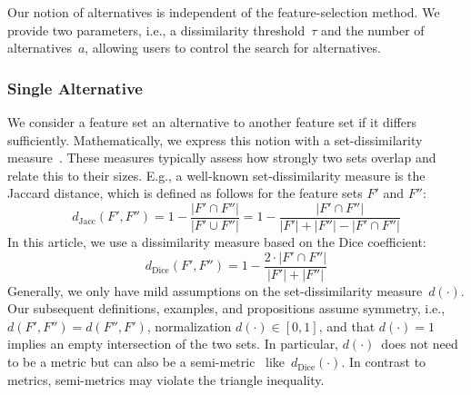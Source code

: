 \documentclass{article}
\theoremstyle{definition}
\begin{document}
Our notion of alternatives is independent of the feature-selection method.
We provide two parameters, i.e., a dissimilarity threshold~$\tau$ and the number of alternatives~$a$, allowing users to control the search for alternatives.

\subsubsection{Single Alternative}
\label{sec:afs:approach:constraints:single}

We consider a feature set an alternative to another feature set if it differs sufficiently.
Mathematically, we express this notion with a set-dissimilarity measure~\cite{choi2010survey, egghe2009new}.
These measures typically assess how strongly two sets overlap and relate this to their sizes.
E.g., a well-known set-dissimilarity measure is the Jaccard distance, which is defined as follows for the feature sets $F'$ and $F''$:
%
\begin{equation}
	d_{\text{Jacc}}(F',F'') = 1 - \frac{|F' \cap F''|}{|F' \cup F''|} = 1 - \frac{|F' \cap F''|}{|F'| + |F''| - |F' \cap F''|}
	\label{eq:afs:jaccard}
\end{equation}
%
In this article, we use a dissimilarity measure based on the Dice coefficient:
%
\begin{equation}
	d_{\text{Dice}}(F',F'') = 1 - \frac{2 \cdot |F' \cap F''|}{|F'| + |F''|}
	\label{eq:afs:dice}
\end{equation}
%
Generally, we only have mild assumptions on the set-dissimilarity measure~$d(\cdot)$.
Our subsequent definitions, examples, and propositions assume symmetry, i.e., $d(F',F'')=d(F'',F')$, normalization $d(\cdot) \in [0,1]$, and that $d(\cdot) = 1$ implies an empty intersection of the two sets.
In particular, $d(\cdot)$~does not need to be a metric but can also be a semi-metric~\cite{wilson1931semi} like~$d_{\text{Dice}}(\cdot)$.
In contrast to metrics, semi-metrics may violate the triangle inequality.
\end{document}
